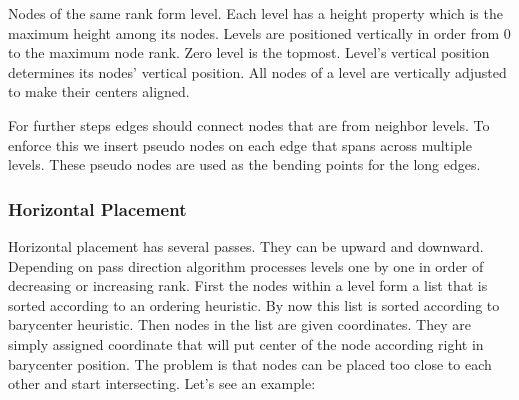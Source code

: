 \documentclass[11pt,a4paper]{article}
\begin{document}
Nodes of the same rank form level. Each level has a height property which is the maximum height among its nodes. Levels are positioned vertically in order from 0 to the maximum node rank. Zero level is the topmost. Level's vertical position determines its nodes' vertical position. All nodes of a level are vertically adjusted to make their centers aligned.

For further steps edges should connect nodes that are from neighbor levels. To enforce this we insert pseudo nodes on each edge that spans across multiple levels. These pseudo nodes are used as the bending points for the long edges.

\subsubsection{Horizontal Placement}
Horizontal placement has several passes. They can be upward and downward. Depending on pass direction algorithm processes levels one by one in order of decreasing or increasing rank. First the nodes within a level form a list that is sorted according to an ordering heuristic. By now this list is sorted according to barycenter heuristic. Then nodes in the list are given coordinates. They are simply assigned coordinate that will put center of the node according right in barycenter position. The problem is that nodes can be placed too close to each other and start intersecting. Let's see an example:\\
\end{document}
